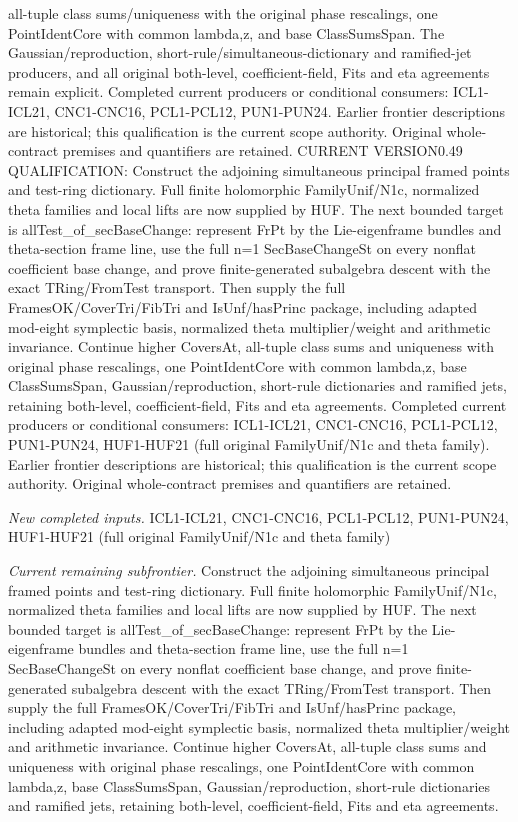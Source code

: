 \documentclass[11pt,a4paper]{article}
\numberwithin{equation}{section}
\theoremstyle{remark}\newtheorem{remark}[theorem]{Remark}
\begin{document}
all-tuple class sums/uniqueness with the original phase rescalings, one PointIdentCore with common lambda,z, and base ClassSumsSpan. The Gaussian/reproduction, short-rule/simultaneous-dictionary and ramified-jet producers, and all original both-level, coefficient-field, Fits and eta agreements remain explicit. Completed current producers or conditional consumers: ICL1-ICL21, CNC1-CNC16, PCL1-PCL12, PUN1-PUN24. Earlier frontier descriptions are historical; this qualification is the current scope authority. Original whole-contract premises and quantifiers are retained. CURRENT VERSION0.49 QUALIFICATION: Construct the adjoining simultaneous principal framed points and test-ring dictionary. Full finite holomorphic FamilyUnif/N1c, normalized theta families and local lifts are now supplied by HUF. The next bounded target is allTest\_\allowbreak of\_\allowbreak secBaseChange: represent FrPt by the Lie-eigenframe bundles and theta-section frame line, use the full n=1 SecBaseChangeSt on every nonflat coefficient base change, and prove finite-generated subalgebra descent with the exact TRing/FromTest transport. Then supply the full FramesOK/CoverTri/FibTri and IsUnf/hasPrinc package, including adapted mod-eight symplectic basis, normalized theta multiplier/weight and arithmetic invariance. Continue higher CoversAt, all-tuple class sums and uniqueness with original phase rescalings, one PointIdentCore with common lambda,z, base ClassSumsSpan, Gaussian/reproduction, short-rule dictionaries and ramified jets, retaining both-level, coefficient-field, Fits and eta agreements. Completed current producers or conditional consumers: ICL1-ICL21, CNC1-CNC16, PCL1-PCL12, PUN1-PUN24, HUF1-HUF21 (full original FamilyUnif/N1c and theta family). Earlier frontier descriptions are historical; this qualification is the current scope authority. Original whole-contract premises and quantifiers are retained.

\emph{New completed inputs.} ICL1-ICL21, CNC1-CNC16, PCL1-PCL12, PUN1-PUN24, HUF1-HUF21 (full original FamilyUnif/N1c and theta family)

\emph{Current remaining subfrontier.} Construct the adjoining simultaneous principal framed points and test-ring dictionary. Full finite holomorphic FamilyUnif/N1c, normalized theta families and local lifts are now supplied by HUF. The next bounded target is allTest\_\allowbreak of\_\allowbreak secBaseChange: represent FrPt by the Lie-eigenframe bundles and theta-section frame line, use the full n=1 SecBaseChangeSt on every nonflat coefficient base change, and prove finite-generated subalgebra descent with the exact TRing/FromTest transport. Then supply the full FramesOK/CoverTri/FibTri and IsUnf/hasPrinc package, including adapted mod-eight symplectic basis, normalized theta multiplier/weight and arithmetic invariance. Continue higher CoversAt, all-tuple class sums and uniqueness with original phase rescalings, one PointIdentCore with common lambda,z, base ClassSumsSpan, Gaussian/reproduction, short-rule dictionaries and ramified jets, retaining both-level, coefficient-field, Fits and eta agreements.
\end{document}

